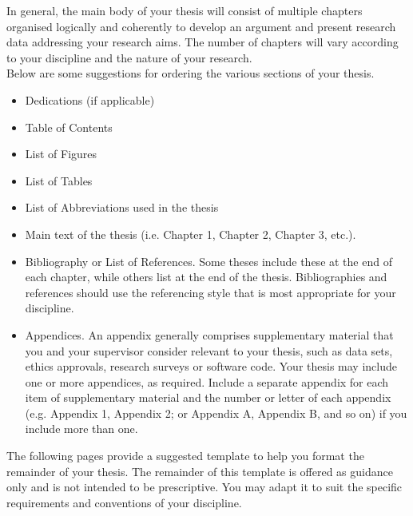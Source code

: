 \begin{instructional}
    \noindent
    In general, the main body of your thesis will consist of multiple chapters organised logically and coherently to develop an argument and present research data addressing your research aims. The number of chapters will vary according to your discipline and the nature of your research.\\
    
    \noindent
    Below are some suggestions for ordering the various sections of your thesis. 
    \begin{itemize}
        \item Dedications (if applicable)
        \item Table of Contents
        \item List of Figures
        \item List of Tables
        \item List of Abbreviations used in the thesis
        \item Main text of the thesis (i.e. Chapter 1, Chapter 2, Chapter 3, etc.). 
        \item Bibliography or List of References. Some theses include these at the end of each chapter, while others list at the end of the thesis. Bibliographies and references should use the referencing style that is most appropriate for your discipline.
        \item Appendices. An appendix generally comprises supplementary material that you and your supervisor consider relevant to your thesis, such as data sets, ethics approvals, research surveys or software code. Your thesis may include one or more appendices, as required. Include a separate appendix for each item of supplementary material and the number or letter of each appendix (e.g. Appendix 1, Appendix 2; or Appendix A, Appendix B, and so on) if you include more than one. 

    \end{itemize}

    \noindent
    The following pages provide a suggested template to help you format the remainder of your thesis. The remainder of this template is offered as guidance only and is not intended to be prescriptive. You may adapt it to suit the specific requirements and conventions of your discipline.
\end{instructional}

\clearpage

\tableofcontents*
	\clearpage
\listoffigures
	\clearpage
\listoftables



